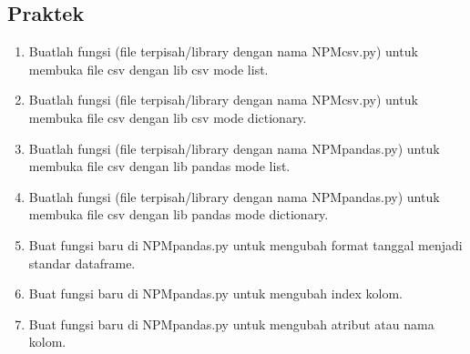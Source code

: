 \subsection{Praktek}
\begin{enumerate}
	\item Buatlah  fungsi  (file  terpisah/library  dengan  nama  NPMcsv.py)  untuk  membuka file csv dengan lib csv mode list.
	
	
	
	\item Buatlah  fungsi  (file  terpisah/library  dengan  nama  NPMcsv.py)  untuk  membuka file csv dengan lib csv mode dictionary.
	
	
	
	\item Buatlah fungsi (file terpisah/library dengan nama NPMpandas.py) untuk membuka file csv dengan lib pandas mode list.
	
	
	
	\item Buatlah fungsi (file terpisah/library dengan nama NPMpandas.py) untuk membuka file csv dengan lib pandas mode dictionary.
	
	
	
	\item  Buat fungsi baru di NPMpandas.py untuk mengubah format tanggal menjadi standar dataframe.
	
	
	
	\item Buat fungsi baru di NPMpandas.py untuk mengubah index kolom.
	
	
	
	\item Buat fungsi baru di NPMpandas.py untuk mengubah atribut atau nama kolom.
	

\end{enumerate}
